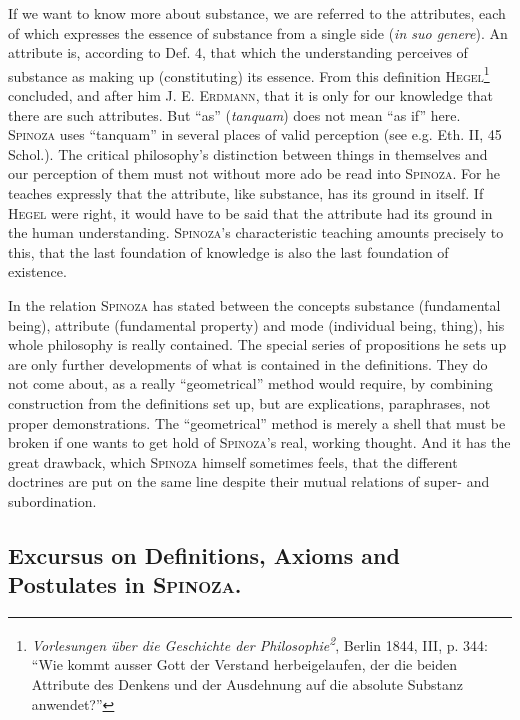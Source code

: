 \documentclass[12pt]{article}
\newcommand{\opage}[1]{\marginnote{\footnotesize\textit{[#1]}}}
\begin{document}
If we want to know more about substance, we are referred to the attributes, each of
which expresses the essence of substance from a single side (\textit{in suo genere}).
An attribute is, according to Def. 4, that which the understanding perceives of
substance as making up (constituting) its essence. From this definition
\textsc{Hegel}\footnote{\textit{Vorlesungen über die Geschichte der
Philosophie\textsuperscript{2}}, Berlin 1844, III, p. 344: ``Wie kommt ausser Gott der
Verstand herbeigelaufen, der die beiden Attribute des Denkens und der Ausdehnung auf
die absolute Substanz anwendet?''} concluded, and after him J. E. \opage{18}\textsc{Erdmann},
that it is only for our knowledge that there are such attributes. But ``as''
(\textit{tanquam}) does not mean ``as if'' here. \textsc{Spinoza} uses ``tanquam'' in
several places of valid perception (see e.g. Eth. II, 45 Schol.). The critical
philosophy's distinction between things in themselves and our perception of them must
not without more ado be read into \textsc{Spinoza}. For he teaches expressly that the
attribute, like substance, has its ground in itself. If \textsc{Hegel} were right, it
would have to be said that the attribute had its ground in the human understanding.
\textsc{Spinoza}'s characteristic teaching amounts precisely to this, that the last
foundation of knowledge is also the last foundation of existence. %

In the relation \textsc{Spinoza} has stated between the concepts substance
(fundamental being), attribute (fundamental property) and mode (individual being,
thing), his whole philosophy is really contained. The special series of propositions
he sets up are only further developments of what is contained in the definitions. They
do not come about, as a really ``geometrical'' method would require, by combining
construction from the definitions set up, but are explications, paraphrases, not
proper demonstrations. The ``geometrical'' method is merely a shell that must be
broken if one wants to get hold of \textsc{Spinoza}'s real, working thought. And it has
the great drawback, which \textsc{Spinoza} himself sometimes feels, that the different
doctrines are put on the same line despite their mutual relations of super- and
subordination.

\subsection*{Excursus on Definitions, Axioms and Postulates in \textsc{Spinoza}.}
\end{document}
